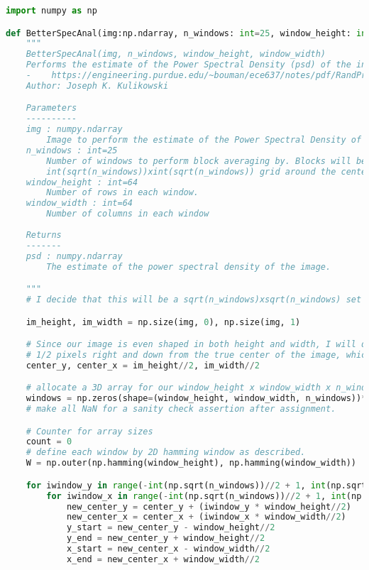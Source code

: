 \documentclass{article}
\begin{document}
\begin{lstlisting}[language=python, caption=BetterSpecAnal.py, label={lst:BetterSpecAnal.py}]
import numpy as np

def BetterSpecAnal(img:np.ndarray, n_windows: int=25, window_height: int=64, window_width: int=64)-> np.ndarray:
    """
    BetterSpecAnal(img, n_windows, window_height, window_width)
    Performs the estimate of the Power Spectral Density (psd) of the input img via block averaging as described here:
    -    https://engineering.purdue.edu/~bouman/ece637/notes/pdf/RandProc.pdf
    Author: Joseph K. Kulikowski

    Parameters
    ----------
    img : numpy.ndarray
        Image to perform the estimate of the Power Spectral Density of
    n_windows : int=25
        Number of windows to perform block averaging by. Blocks will be taken out of img in a
        int(sqrt(n_windows))xint(sqrt(n_windows)) grid around the center of the image.
    window_height : int=64
        Number of rows in each window.
    window_width : int=64
        Number of columns in each window
    
    Returns
    -------
    psd : numpy.ndarray
        The estimate of the power spectral density of the image.

    """
    # I decide that this will be a sqrt(n_windows)xsqrt(n_windows) set of blocks starting at the center pixel.

    im_height, im_width = np.size(img, 0), np.size(img, 1)

    # Since our image is even shaped in both height and width, I will define the "Center" of the image to be 
    # 1/2 pixels right and down from the true center of the image, which is between 4 pixels.
    center_y, center_x = im_height//2, im_width//2

    # allocate a 3D array for our window_height x window_width x n_windows to perform fft/averaging over.
    windows = np.zeros(shape=(window_height, window_width, n_windows))*np.nan
    # make all NaN for a sanity check assertion after assignment.

    # Counter for array sizes
    count = 0
    # define each window by 2D hamming window as described.
    W = np.outer(np.hamming(window_height), np.hamming(window_width))

    for iwindow_y in range(-int(np.sqrt(n_windows))//2 + 1, int(np.sqrt(n_windows))//2 + 1):
        for iwindow_x in range(-int(np.sqrt(n_windows))//2 + 1, int(np.sqrt(n_windows))//2 + 1):
            new_center_y = center_y + (iwindow_y * window_height//2)
            new_center_x = center_x + (iwindow_x * window_width//2)
            y_start = new_center_y - window_height//2
            y_end = new_center_y + window_height//2
            x_start = new_center_x - window_width//2
            x_end = new_center_x + window_width//2


\end{lstlisting}
\end{document}
